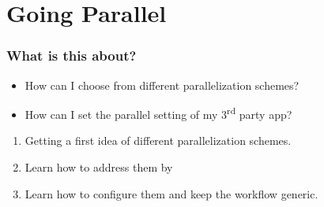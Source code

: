 \section{Going Parallel}
{   
}

\begin{frame}
	\frametitle{What is this about?}
	\begin{question}[Questions]
		\begin{itemize}
			\item How can I choose from different parallelization schemes?
			\item How can I set the parallel setting of my 3\textsuperscript{rd} party app?
		\end{itemize}
	\end{question}
	\begin{docs}[Objectives]
		\begin{enumerate}
			\item Getting a first idea of different parallelization schemes. 
			\item Learn how to address them by \Snakemake
			\item Learn how to configure them and keep the workflow generic.
		\end{enumerate}
	\end{docs}
\end{frame}

